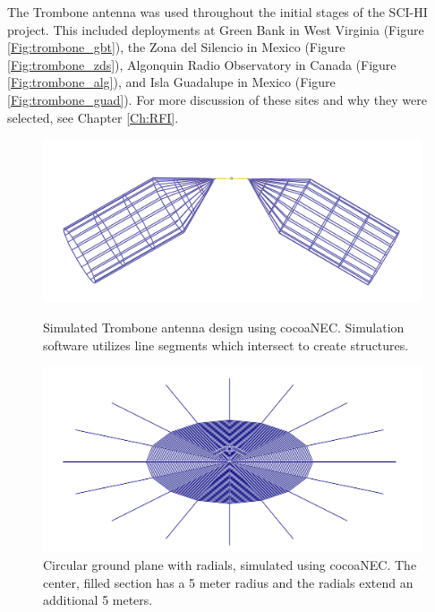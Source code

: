 The Trombone antenna was used throughout the initial stages of the SCI-HI project. This included deployments at Green Bank in West Virginia (Figure \ref{Fig:trombone_gbt}), the Zona del Silencio in Mexico (Figure \ref{Fig:trombone_zds}), Algonquin Radio Observatory in Canada (Figure \ref{Fig:trombone_alg}), and Isla Guadalupe in Mexico (Figure \ref{Fig:trombone_guad}). For more discussion of these sites and why they were selected, see Chapter \ref{Ch:RFI}.

\begin{figure}[htb]
\centering
\begin{minipage}[b]{0.56\textwidth}
\centering
\includegraphics[width=0.95\linewidth]{SCIHI_system/figures/trombone_sim.png}
\caption{Simulated Trombone antenna design using cocoaNEC. Simulation software utilizes line segments which intersect to create structures. }
\label{Fig:trombone_sym}
\end{minipage}%
\begin{minipage}[b]{0.02\textwidth}
\hspace{1cm}
\end{minipage}%
\begin{minipage}[b]{0.42\textwidth}
\centering
\includegraphics[width=0.95\linewidth]{SCIHI_system/figures/ground_plane_sim.png}
\caption{Circular ground plane with radials, simulated using cocoaNEC. The center, filled section has a 5 meter radius and the radials extend an additional 5 meters.}
\label{Fig:gp_sym}
\end{minipage}
\end{figure}

